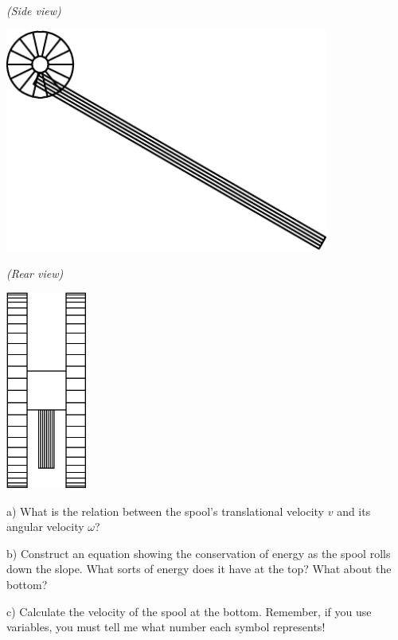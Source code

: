 \documentclass[12pt]{article}
\newcommand{\BC}{\begin{center}}
\newcommand{\EC}{\end{center}}
\begin{document}
	\begin{minipage}{0.5\textwidth}
		\BC
		\it (Side view)
		
		\includegraphics[width=0.8\textwidth]{sideview-crop.pdf}
		\EC
	\end{minipage}
	\begin{minipage}{0.5\textwidth}
		\BC
		\it (Rear view)
		
		\vspace{1cm}
		
		\includegraphics[width=0.2\textwidth]{rearview-crop.pdf}
		\EC
	\end{minipage}
	

	
	a) What is the relation between the spool's translational velocity $v$ and its angular velocity $\omega$? 
	

	b) Construct an equation showing the conservation of energy as the spool rolls down the slope. What sorts of energy does it have at the top? What about the bottom?
	
	c) Calculate the velocity of the spool at the bottom. Remember, if you use variables, you must tell me what number each symbol represents!
	
	
\end{document}
